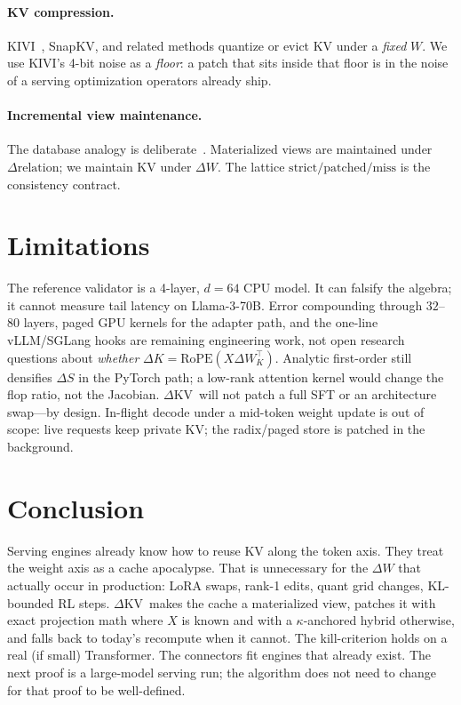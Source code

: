 \documentclass{article}
\newcommand{\dkv}{$\Delta$KV}
\begin{document}
\paragraph{KV compression.}
KIVI~\citep{liu2024kivi}, SnapKV, and related methods quantize or
evict KV under a \emph{fixed} $W$.
We use KIVI's 4-bit noise as a \emph{floor}: a patch that sits inside
that floor is in the noise of a serving optimization operators already
ship.

\paragraph{Incremental view maintenance.}
The database analogy is deliberate~\citep{gupta1993ivm}.
Materialized views are maintained under $\Delta\mathrm{relation}$; we
maintain KV under $\Delta W$.
The lattice $\mathrm{strict}/\mathrm{patched}/\mathrm{miss}$ is the
consistency contract.

\section{Limitations}
\label{sec:limit}

The reference validator is a 4-layer, $d{=}64$ CPU model.
It can falsify the algebra; it cannot measure tail latency on Llama-3-70B.
Error compounding through $32$--$80$ layers, paged GPU kernels for the
adapter path, and the one-line vLLM/SGLang hooks are remaining engineering
work, not open research questions about \emph{whether} $\Delta K=\mathrm{RoPE}(X\Delta W_K^\top)$.
Analytic first-order still densifies $\Delta S$ in the PyTorch path; a
low-rank attention kernel would change the flop ratio, not the Jacobian.
\dkv\ will not patch a full SFT or an architecture swap---by design.
In-flight decode under a mid-token weight update is out of scope: live
requests keep private KV; the radix/paged store is patched in the
background.

\section{Conclusion}
\label{sec:conc}

Serving engines already know how to reuse KV along the token axis.
They treat the weight axis as a cache apocalypse.
That is unnecessary for the $\Delta W$ that actually occur in production:
LoRA swaps, rank-1 edits, quant grid changes, KL-bounded RL steps.
\dkv\ makes the cache a materialized view, patches it with exact
projection math where $X$ is known and with a $\kappa$-anchored hybrid
otherwise, and falls back to today's recompute when it cannot.
The kill-criterion holds on a real (if small) Transformer.
The connectors fit engines that already exist.
The next proof is a large-model serving run; the algorithm does not
need to change for that proof to be well-defined.
\end{document}
